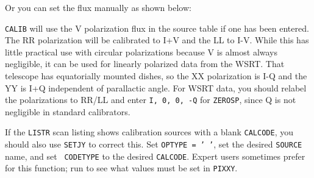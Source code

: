 Or you can set the flux manually as shown below:

{\tt CALIB} will use the V polarization flux in the source table if
one has been entered.  The RR polarization will be calibrated to I+V
and the LL to I-V.  While this has little practical use with circular
polarizations because V is almost always negligible, it can be used
for linearly polarized data from the WSRT\@.  That telescope has
equatorially mounted dishes, so the XX polarization is I-Q and the
YY is I+Q independent of parallactic angle.  For WSRT data, you should
relabel the polarizations to RR/LL and enter {\tt I, 0, 0, -Q} for
{\tt ZEROSP}, since Q is not negligible in standard calibrators.

If the {\tt LISTR} scan listing shows calibration sources with a blank
{\tt CALCODE}, you should also use {\tt SETJY} to correct this.  Set
{\tt OPTYPE = ' '}, set the desired {\tt SOURCE} name, and set {\tt
CODETYPE} to the desired {\tt CALCODE}.  Expert users sometimes prefer
{\tt {}} for this function; run {\tt {}} to see
what values must be set in {\tt PIXXY}\@.



